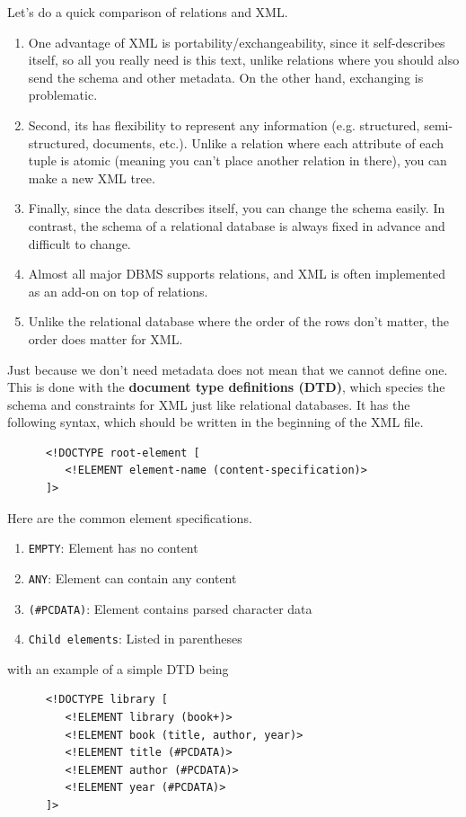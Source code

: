  Let's do a quick comparison of relations and XML. 
  \begin{enumerate}
    \item One advantage of XML is portability/exchangeability, since it self-describes itself, so all you really need is this text, unlike relations where you should also send the schema and other metadata. On the other hand, exchanging is problematic. 
    \item Second, its has flexibility to represent any information (e.g. structured, semi-structured, documents, etc.). Unlike a relation where each attribute of each tuple is atomic (meaning you can't place another relation in there), you can make a new XML tree. 
    \item Finally, since the data describes itself, you can change the schema easily. In contrast, the schema of a relational database is always fixed in advance and difficult to change. 
    \item Almost all major DBMS supports relations, and XML is often implemented as an add-on on top of relations. 
    \item Unlike the relational database where the order of the rows don't matter, the order does matter for XML. 
  \end{enumerate}
  
  \begin{definition}[DTD]
    \label{def:dtd}
    Just because we don't need metadata does not mean that we cannot define one. This is done with the \textbf{document type definitions (DTD)}, which species the schema and constraints for XML just like relational databases. It has the following syntax, which should be written in the beginning of the XML file. 
    \begin{lstlisting}
      <!DOCTYPE root-element [
         <!ELEMENT element-name (content-specification)>
      ]> 
    \end{lstlisting} 
    Here are the common element specifications. 
    \begin{enumerate}
      \item \texttt{EMPTY}: Element has no content
      \item \texttt{ANY}: Element can contain any content
      \item \texttt{(\#PCDATA)}: Element contains parsed character data
      \item \texttt{Child elements}: Listed in parentheses
    \end{enumerate}
    with an example of a simple DTD being 
    \begin{lstlisting}
      <!DOCTYPE library [
         <!ELEMENT library (book+)>
         <!ELEMENT book (title, author, year)>
         <!ELEMENT title (#PCDATA)>
         <!ELEMENT author (#PCDATA)>
         <!ELEMENT year (#PCDATA)>
      ]> 
    \end{lstlisting}
  \end{definition}

